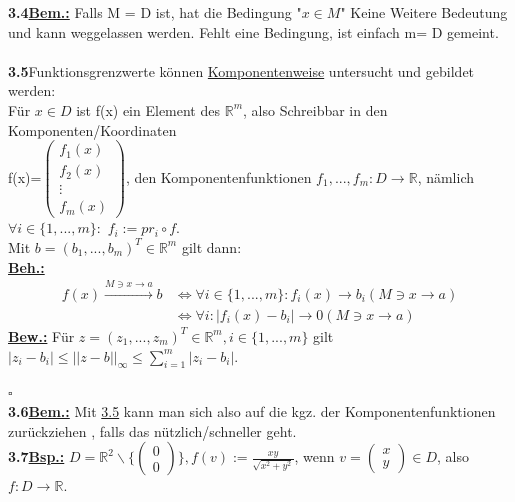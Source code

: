 \documentclass[]{scrartcl}
\begin{document}
	\textbf{3.4\underline{Bem.:}} Falls M = D ist, hat die Bedingung "$x\in M$" Keine Weitere Bedeutung und kann weggelassen werden. Fehlt eine Bedingung, ist einfach m= D gemeint.\\\\
	
	\textbf{3.5}Funktionsgrenzwerte können \underline{Komponentenweise} untersucht und gebildet werden:\\
	Für $ x \in D$ ist f(x) ein Element des $\mathbb{R}^m$, also Schreibbar in den Komponenten/Koordinaten\\
	f(x)=$\begin{pmatrix}
		f_1(x)\\f_2(x)\\\vdots\\ f_m(x)
	\end{pmatrix}$, den Komponentenfunktionen $f_1,...,f_m: D\rightarrow\mathbb{R}$, nämlich $\forall i \in \{1,...,m\}:$  \ul{$f_i:=pr_i\circ f$}.\\
	Mit $b= (b_1,...,b_m)^T \in \mathbb{R}^m$ gilt dann:\\
	\textbf{\underline{Beh.:}} \begin{equation}\begin{split}
		f(x)\xrightarrow{M\ni x \rightarrow a}b & \Leftrightarrow \forall i \in 
		\{1,...,m\}: f_i (x)\rightarrow b_i (M\ni x\rightarrow a)\\
		 & \Leftrightarrow\forall i: |f_i(x)-b_i|\rightarrow0(M\ni x 
		 \rightarrow a)
		\end{split}
	\end{equation} 
	\textbf{\underline{Bew.:}} Für $z= (z_1,...,z_m)^T \in \mathbb{R}^m, i\in \{1,...,m\}$ gilt $|z_i-b_i|\leq||z-b||_\infty \leq \sum_{i=1}^{m}|z_i-b_i|.$\\
	\strut\hfill $\square$\\
	\textbf{3.6\underline{Bem.:}} Mit  \ul{3.5} kann man sich also auf die kgz. der Komponentenfunktionen zurückziehen , falls das nützlich/schneller geht.\\
	\textbf{3.7\underline{Bsp.:}} $D = \mathbb{R}^2 \backslash\{\begin{pmatrix}0\\0\end{pmatrix}\}, f(v):=\frac{xy}{\sqrt{x^2+y^2}}$, wenn $v=\begin{pmatrix}x\\y\end{pmatrix} \in D$, also $f:D\rightarrow\mathbb{R}$.\\
\end{document}
